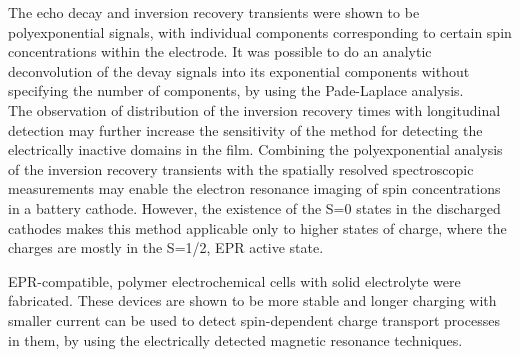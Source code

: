 The echo decay and inversion recovery transients were shown to be polyexponential signals, with individual components corresponding to certain spin concentrations within the electrode. It was possible to do an analytic deconvolution of the devay signals into its exponential components without specifying the number of components, by using the Pade-Laplace analysis.\\

The observation of distribution of the inversion recovery times with longitudinal detection may further increase the sensitivity of the method for detecting the electrically inactive domains in the film. Combining the polyexponential analysis of the inversion recovery transients with the spatially resolved spectroscopic measurements may enable the electron resonance imaging of spin concentrations in a battery cathode. However, the existence of the S=0 states in the discharged cathodes makes this method applicable only to higher states of charge, where the charges are mostly in the S=1/2, EPR active state.


EPR-compatible, polymer electrochemical cells with solid electrolyte were fabricated. These devices are shown to be more stable and longer charging with smaller current can be used to detect spin-dependent charge transport processes in them, by using the electrically detected magnetic resonance techniques.\\






